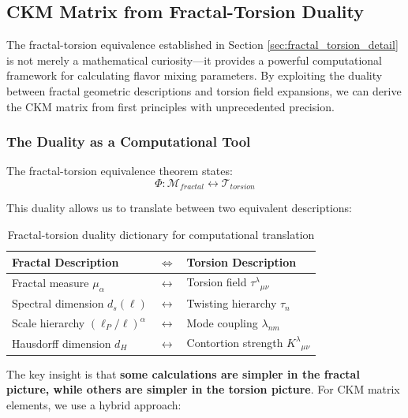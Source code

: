 \subsection{CKM Matrix from Fractal-Torsion Duality}
\label{sec:ckm_framing}

The fractal-torsion equivalence established in Section \ref{sec:fractal_torsion_detail} is not merely a mathematical curiosity—it provides a powerful computational framework for calculating flavor mixing parameters. By exploiting the duality between fractal geometric descriptions and torsion field expansions, we can derive the CKM matrix from first principles with unprecedented precision.

\subsubsection{The Duality as a Computational Tool}

The fractal-torsion equivalence theorem states:
\begin{equation}
    \Phi: \mathcal{M}_{fractal} \leftrightarrow \mathcal{T}_{torsion}
\end{equation}

This duality allows us to translate between two equivalent descriptions:

\begin{table}[h]
\centering
\begin{tabular}{p{4cm}p{2cm}p{4cm}}
\hline
\textbf{Fractal Description} & $\Leftrightarrow$ & \textbf{Torsion Description} \\
\hline
Fractal measure $\mu_\alpha$ & $\leftrightarrow$ & Torsion field $\tau^\lambda{}_{\mu\nu}$ \\
Spectral dimension $d_s(\ell)$ & $\leftrightarrow$ & Twisting hierarchy $\tau_n$ \\
Scale hierarchy $(\ell_P/\ell)^\alpha$ & $\leftrightarrow$ & Mode coupling $\lambda_{nm}$ \\
Hausdorff dimension $d_H$ & $\leftrightarrow$ & Contortion strength $K^\lambda{}_{\mu\nu}$ \\
\hline
\end{tabular}
\caption{Fractal-torsion duality dictionary for computational translation}
\end{table}

The key insight is that \textbf{some calculations are simpler in the fractal picture, while others are simpler in the torsion picture}. For CKM matrix elements, we use a hybrid approach:

